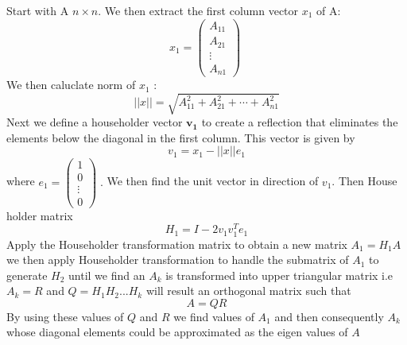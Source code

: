 \documentclass[pdflatex,sn-mathphys-num]{sn-jnl}
\begin{document}
Start with A $n\times n $. We then extract the first column vector $x_1$ of A:
$$ x_1 = \begin{pmatrix} A_{11} \\A_{21}\\ \vdots \\ A_{n1} \end{pmatrix} \;     $$
We then caluclate norm of $x_1$ :
$$     ||x|| = \sqrt{ A^{2}_{11}+ A^{2}_{21}+\cdots+A^{2}_{n1}}$$
Next we define a householder vector $\mathbf{v_1}$  to create a reflection that eliminates the elements below the diagonal in the first column. This vector is given by 
$$  v_1  = x_1 - ||x||e_1$$
where $e_1 = \begin{pmatrix} 1 \\ 0 \\ \vdots\\0 \end{pmatrix} \; . $ We then find the unit vector in direction of $v_1$. Then House holder matrix $$H_1 = I  - 2 v_1v_1^{T} e_1  $$ 
Apply the Householder transformation matrix to obtain a new matrix $A_1 =H_1A$ we then apply Householder transformation to handle the submatrix of $A_1$ to generate $H_2$ until we find an $A_k$ is transformed into upper triangular matrix i.e $A_k = R $ and $Q = H_1H_2...H_k$ will result an orthogonal matrix such that
$$ A =QR$$
By using these values of $Q$ and $R$ we find values of $A_1$ and then consequently $A_k$ whose diagonal elements could be approximated as the eigen values of $A$

\newpage
\end{document}
